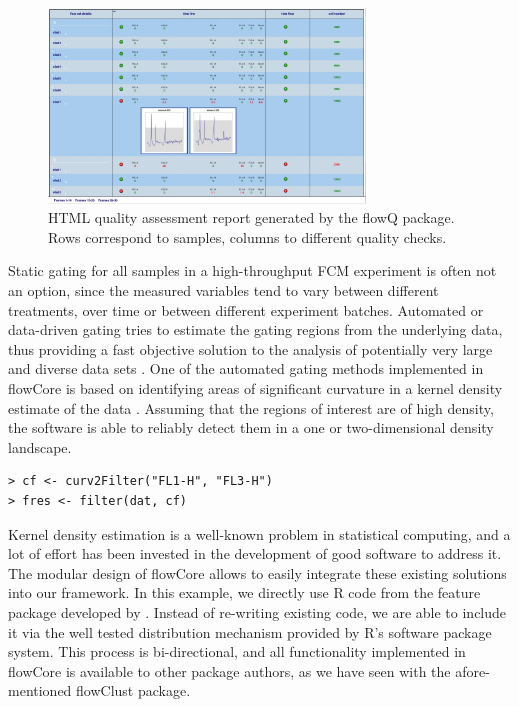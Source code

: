 \documentclass[12pt]{article}
\begin{document}
\begin{figure}[htbp]
\centering
\includegraphics[width=0.75\textwidth]{flowQ.jpg}
\caption{\label{flowQ}%
  HTML quality assessment report generated by
  the flowQ package. Rows correspond to samples, columns to different
  quality checks.}
\end{figure}

Static gating for all samples in a high-throughput FCM experiment is
often not an option, since the measured variables tend to vary between
different treatments, over time or between different experiment
batches. Automated or data-driven gating tries to estimate the gating
regions from the underlying data, thus providing a fast objective
solution to the analysis of potentially very large and diverse data
sets \cite{lo2008agf}. One of the automated gating methods implemented
in flowCore is based on identifying areas of significant curvature in
a kernel density estimate of the data \citep{wand2008}. Assuming that
the regions of interest are of high density, the software is able to
reliably detect them in a one or two-dimensional density landscape.

\begin{verbatim}
> cf <- curv2Filter("FL1-H", "FL3-H")
> fres <- filter(dat, cf)
\end{verbatim}

Kernel density estimation is a well-known problem in statistical
computing, and a lot of effort has been invested in the development of
good software to address it. The modular design of flowCore allows to
easily integrate these existing solutions into our framework. In this
example, we directly use R code from the feature package developed by
\cite{wand2008}. Instead of re-writing existing code, we are able to
include it via the well tested distribution mechanism provided by R's
software package system. This process is bi-directional, and all
functionality implemented in flowCore is available to other package
authors, as we have seen with the afore-mentioned flowClust package.
\end{document}
